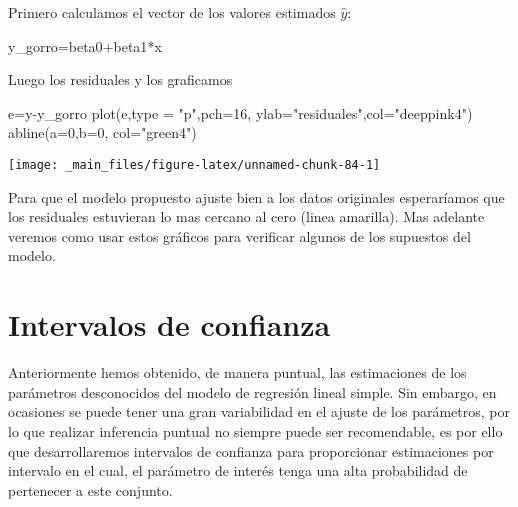\documentclass[
  a4paper,
  oneside,
  openany]{book}
\newenvironment{Shaded}{\begin{snugshade}}{\end{snugshade}}
\newcommand{\AttributeTok}[1]{\textcolor[rgb]{0.77,0.63,0.00}{#1}}
\newcommand{\DecValTok}[1]{\textcolor[rgb]{0.00,0.00,0.81}{#1}}
\newcommand{\FunctionTok}[1]{\textcolor[rgb]{0.00,0.00,0.00}{#1}}
\newcommand{\NormalTok}[1]{#1}
\newcommand{\OtherTok}[1]{\textcolor[rgb]{0.56,0.35,0.01}{#1}}
\newcommand{\SpecialCharTok}[1]{\textcolor[rgb]{0.00,0.00,0.00}{#1}}
\newcommand{\StringTok}[1]{\textcolor[rgb]{0.31,0.60,0.02}{#1}}
\begin{document}
Primero calculamos el vector de los valores estimados \(\hat{y}\):

\begin{Shaded}
\begin{Highlighting}[]
\NormalTok{y\_gorro}\OtherTok{=}\NormalTok{beta0}\SpecialCharTok{+}\NormalTok{beta1}\SpecialCharTok{*}\NormalTok{x}
\end{Highlighting}
\end{Shaded}

Luego los residuales y los graficamos

\begin{Shaded}
\begin{Highlighting}[]
\NormalTok{e}\OtherTok{=}\NormalTok{y}\SpecialCharTok{{-}}\NormalTok{y\_gorro }
\FunctionTok{plot}\NormalTok{(e,}\AttributeTok{type =} \StringTok{"p"}\NormalTok{,}\AttributeTok{pch=}\DecValTok{16}\NormalTok{, }\AttributeTok{ylab=}\StringTok{"residuales"}\NormalTok{,}\AttributeTok{col=}\StringTok{"deeppink4"}\NormalTok{) }
\FunctionTok{abline}\NormalTok{(}\AttributeTok{a=}\DecValTok{0}\NormalTok{,}\AttributeTok{b=}\DecValTok{0}\NormalTok{, }\AttributeTok{col=}\StringTok{"green4"}\NormalTok{)}
\end{Highlighting}
\end{Shaded}

\begin{center}\texttt{[image: \_main\_files/figure-latex/unnamed-chunk-84-1]} \end{center}

Para que el modelo propuesto ajuste bien a los datos originales esperaríamos que los residuales estuvieran lo mas cercano al cero (linea amarilla). Mas adelante veremos como usar estos gráficos para verificar algunos de los supuestos del modelo.

\hypertarget{intervalos-de-confianza-1}{%
\chapter{Intervalos de confianza}\label{intervalos-de-confianza-1}}

Anteriormente hemos obtenido, de manera puntual, las estimaciones de los parámetros desconocidos del modelo de regresión lineal simple. Sin embargo, en ocasiones se puede tener una gran variabilidad en el ajuste de los parámetros, por lo que realizar inferencia puntual no siempre puede ser recomendable, es por ello que desarrollaremos intervalos de confianza para proporcionar estimaciones por intervalo en el cual, el parámetro de interés tenga una alta probabilidad de pertenecer a este conjunto.
\end{document}
